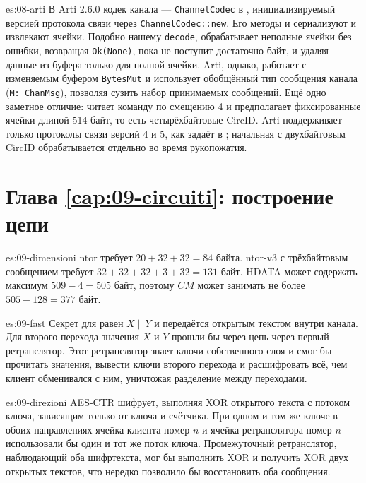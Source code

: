 \begin{soluzione}{es:08-arti}
В Arti 2.6.0 кодек канала — \texttt{ChannelCodec} в , инициализируемый версией протокола связи через \texttt{ChannelCodec::new}. Его методы  и  сериализуют и извлекают ячейки. Подобно нашему \texttt{decode},  обрабатывает неполные ячейки без ошибки, возвращая \texttt{Ok(None)}, пока не поступит достаточно байт, и удаляя данные из буфера только для полной ячейки. Arti, однако, работает с изменяемым буфером \texttt{BytesMut} и использует обобщённый тип сообщения канала (\texttt{M: ChanMsg}), позволяя сузить набор принимаемых сообщений. Ещё одно заметное отличие:  читает команду по смещению 4 и предполагает фиксированные ячейки длиной 514 байт, то есть четырёхбайтовые CircID. Arti поддерживает только протоколы связи версий 4 и 5, как задаёт  в ; начальная  с двухбайтовым CircID обрабатывается отдельно во время рукопожатия.
\end{soluzione}

\section*{Глава \ref{cap:09-circuiti}: построение цепи}

\begin{soluzione}{es:09-dimensioni}
ntor требует $20 + 32 + 32 = 84$ байта. ntor-v3 с трёхбайтовым сообщением требует $32 + 32 + 32 + 3 + 32 = 131$ байт. HDATA может содержать максимум $509 - 4 = 505$ байт, поэтому $CM$ может занимать не более $505 - 128 = 377$ байт.
\end{soluzione}

\begin{soluzione}{es:09-fast}
Секрет для  равен $X \| Y$ и передаётся открытым текстом внутри канала. Для второго перехода значения $X$ и $Y$ прошли бы через цепь через первый ретранслятор. Этот ретранслятор знает ключи собственного слоя и смог бы прочитать значения, вывести ключи второго перехода и расшифровать всё, чем клиент обменивался с ним, уничтожая разделение между переходами.
\end{soluzione}

\begin{soluzione}{es:09-direzioni}
AES-CTR шифрует, выполняя XOR открытого текста с потоком ключа, зависящим только от ключа и счётчика. При одном и том же ключе в обоих направлениях ячейка клиента номер $n$ и ячейка ретранслятора номер $n$ использовали бы один и тот же поток ключа. Промежуточный ретранслятор, наблюдающий оба шифртекста, мог бы выполнить XOR и получить XOR двух открытых текстов, что нередко позволило бы восстановить оба сообщения.
\end{soluzione}

